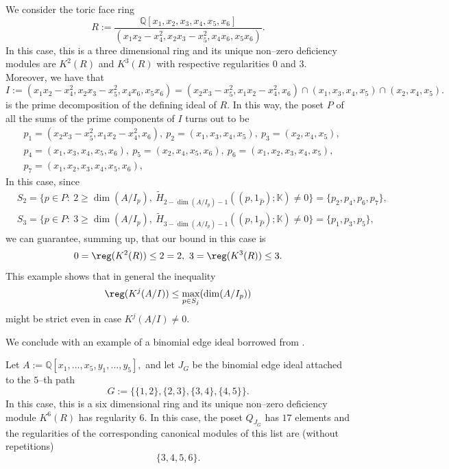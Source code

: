 \documentclass[11pt]{amsart}
\begin{document}
\begin{ex}
We consider the toric face ring
\[
R:=\frac{\mathbb{Q}[x_1,x_2,x_3,x_4,x_5,x_6]}{(x_1x_2-x_4^2,x_2x_3-x_5^2,x_4x_6,x_5x_6)}.
\]
In this case, this is a three dimensional ring and its unique non--zero deficiency modules are $K^2 (R)$ and $K^3 (R)$ with respective regularities $0$ and $3.$ Moreover, we have that
\[
I:=(x_1x_2-x_4^2,x_2x_3-x_5^2,x_4x_6,x_5x_6)=(x_2x_3-x_5^2,x_1x_2-x_4^2,x_6)\cap (x_1,x_3,x_4,x_5)\cap (x_2,x_4,x_5).
\]
is the prime decomposition of the defining ideal of $R.$ In this way, the poset $P$ of all the sums of the prime components of $I$ turns out to be
\begin{align*}
& p_1=(x_2x_3-x_5^2,x_1x_2-x_4^2,x_6),\ p_2=(x_1,x_3,x_4,x_5),\ p_3=(x_2,x_4,x_5),\\
& p_4=(x_1,x_3,x_4,x_5,x_6),\ p_5=(x_2,x_4,x_5,x_6),\ p_6=(x_1,x_2,x_3,x_4,x_5),\\
& p_7=(x_1,x_2,x_3,x_4,x_5,x_6),
\end{align*}
In this case, since
\begin{align*}
& S_2=\{p\in P:\ 2\geq\dim (A/I_p),\ \widetilde{H}_{2-\dim(A/I_p)-1}((p,1_{\widehat{P}});\mathbb{K})\neq 0\}=\{p_2,p_4,p_6,p_7\},\\
& S_3=\{p\in P:\ 3\geq\dim (A/I_p),\ \widetilde{H}_{3-\dim(A/I_p)-1}((p,1_{\widehat{P}});\mathbb{K})\neq 0\}=\{p_1,p_3,p_5\},
\end{align*}
we can guarantee, summing up, that our bound in this case is
\[
0=\reg (K^2 (R))\leq 2=2,\ 3=\reg (K^3(R))\leq 3.
\]
This example shows that in general the inequality
\[
\reg(K^j(A/I))\leq\max_{p\in S_j} (\dim (A/I_p))
\]
might be strict even in case $K^j (A/I)\neq 0$.
\end{ex}

We conclude with an example of a binomial edge ideal borrowed from \cite[Example 3.2]{AlvarezMontaner2020}.

\begin{ex}
Let $A:=\mathbb{Q}[x_1,\ldots,x_5,y_1,\ldots,y_5],$ and let $J_G$ be the binomial edge ideal attached to the $5$--th path
\[
G:=\{\{1,2\},\{2,3\},\{3,4\},\{4,5\}\}.
\]
In this case, this is a six dimensional ring and its unique non--zero deficiency module $K^6 (R)$ has regularity $6.$ In this case, the poset $Q_{J_G}$ has $17$ elements and the regularities of the corresponding canonical modules of this list are (without repetitions)
\[
\{3,4,5,6\}.
\]
\end{ex}
\end{document}
